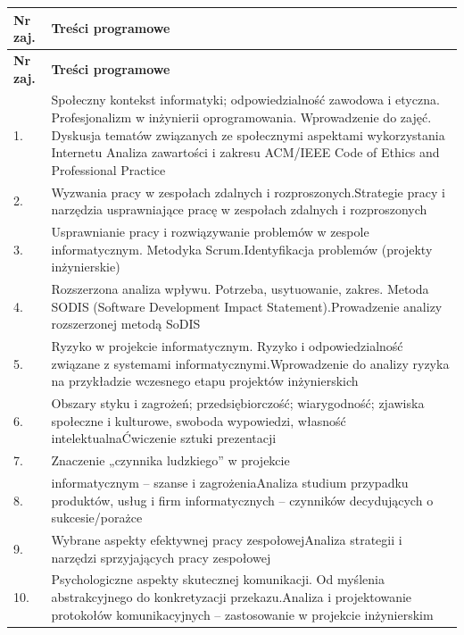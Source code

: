 \documentclass[12pt, a4paper]{article}
\newcommand{\thdrule}{\noalign{\global\setlength{\extrarowheight}{0pt}}}
\newcommand{\thdend}{\noalign{\global\setlength{\extrarowheight}{3pt}}}
\begin{document}
{\scriptsize
\begin{longtable}{m{1.5cm}m{14.5cm}}
\thdrule\toprule
\rowcolor{pjatkRed} {\color{white}\textbf{Nr zaj.}} & {\color{white}\textbf{Treści programowe}} \\
\midrule\thdend
\endfirsthead
\thdrule\toprule
\rowcolor{pjatkRed} {\color{white}\textbf{Nr zaj.}} & {\color{white}\textbf{Treści programowe}} \\
\midrule\thdend
\endhead
  \rowcolor{tableRowLight} 1. & Społeczny kontekst informatyki; odpowiedzialność zawodowa i etyczna. Profesjonalizm w inżynierii oprogramowania. Wprowadzenie do zajęć. Dyskusja tematów związanych ze społecznymi aspektami wykorzystania Internetu Analiza zawartości i zakresu ACM/IEEE Code of Ethics and Professional Practice \\
  \rowcolor{tableRowAlt} 2. & Wyzwania pracy w zespołach zdalnych i rozproszonych.Strategie pracy i narzędzia usprawniające pracę w zespołach zdalnych i rozproszonych \\
  \rowcolor{tableRowLight} 3. & Usprawnianie pracy i rozwiązywanie problemów w zespole informatycznym. Metodyka Scrum.Identyfikacja problemów (projekty inżynierskie) \\
  \rowcolor{tableRowAlt} 4. & Rozszerzona analiza wpływu. Potrzeba, usytuowanie, zakres. Metoda SODIS (Software Development Impact Statement).Prowadzenie analizy rozszerzonej metodą SoDIS \\
  \rowcolor{tableRowLight} 5. & Ryzyko w projekcie informatycznym. Ryzyko i odpowiedzialność związane z systemami informatycznymi.Wprowadzenie do analizy ryzyka na przykładzie wczesnego etapu projektów inżynierskich \\
  \rowcolor{tableRowAlt} 6. & Obszary styku i zagrożeń; przedsiębiorczość; wiarygodność; zjawiska społeczne i kulturowe, swoboda wypowiedzi, własność intelektualnaĆwiczenie sztuki prezentacji \\
  \rowcolor{tableRowLight} 7. & Znaczenie „czynnika ludzkiego” w projekcie \\
  \rowcolor{tableRowAlt} 8. & informatycznym – szanse i zagrożeniaAnaliza studium przypadku produktów, usług i firm informatycznych – czynników decydujących o sukcesie/porażce \\
  \rowcolor{tableRowLight} 9. & Wybrane aspekty efektywnej pracy zespołowejAnaliza strategii i narzędzi sprzyjających pracy zespołowej \\
  \rowcolor{tableRowAlt} 10. & Psychologiczne aspekty skutecznej komunikacji. Od myślenia abstrakcyjnego do konkretyzacji przekazu.Analiza i projektowanie protokołów komunikacyjnych – zastosowanie w projekcie inżynierskim \\

\end{longtable}}
\end{document}
